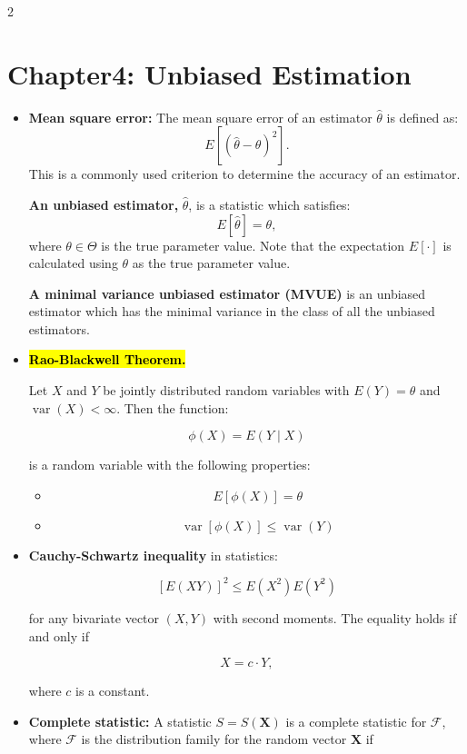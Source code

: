 \documentclass[a4paper,10pt]{article}
\begin{document}
\begin{multicols}{2}
\begin{itemize}
\end{itemize}
    

\section*{Chapter4: Unbiased Estimation}
\begin{itemize}
    \item \textbf{Mean square error:} The mean square error of an estimator \( \hat{\theta} \) is defined as:
    \[
    E[(\hat{\theta} - \theta)^2].
    \]
    This is a commonly used criterion to determine the accuracy of an estimator.
    
    \textbf{An unbiased estimator,} \( \hat{\theta} \), is a statistic which satisfies:
    \[
    E[\hat{\theta}] = \theta,
    \]
    where \( \theta \in \Theta \) is the true parameter value. Note that the expectation \( E[\cdot] \) is calculated using \( \theta \) as the true parameter value.
    
    \textbf{A minimal variance unbiased estimator (MVUE)} is an unbiased estimator which has the minimal variance in the class of all the unbiased estimators.

    \item \hl{\textbf{Rao-Blackwell Theorem.}}

    Let \( X \) and \( Y \) be jointly distributed random variables with \( E(Y) = \theta \) and \( \operatorname{var}(X) < \infty \). Then the function:
    
    \[
    \phi(X) = E(Y \mid X)
    \]
    
    is a random variable with the following properties:
    
    \begin{itemize}
        \item \[
            E[\phi(X)] = \theta
            \]
        \item \[
            \operatorname{var}[\phi(X)] \leq \operatorname{var}(Y)
            \]
    \end{itemize}

    \item \textbf{Cauchy-Schwartz inequality} in statistics:

    \[
    [E(XY)]^2 \leq E(X^2)E(Y^2)
    \]
    
    for any bivariate vector \( (X,Y) \) with second moments. The equality holds if and only if
    
    \[
    X = c \cdot Y,
    \]
    
    where \( c \) is a constant.
    \item \textbf{Complete statistic:} A statistic \( S = S(\mathbf{X}) \) is a complete statistic for \( \mathcal{F} \), where \( \mathcal{F} \) is the distribution family for the random vector \( \mathbf{X} \) if


\end{itemize}
\end{multicols}
\end{document}
